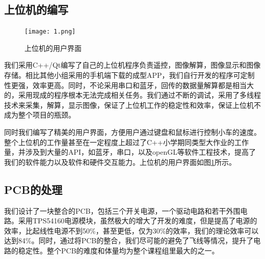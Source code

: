 \documentclass[a4paper]{paper}
\begin{document}
\subsection{上位机的编写}
\begin{figure}
    \centering
    \texttt{[image: 1.png]}
    \caption{上位机的用户界面}
    \label{UI}
\end{figure}
我们采用C++/Qt编写了自己的上位机程序负责遥控，图像解算，图像显示和图像存储。相比其他小组采用的手机端下载的成型APP，我们自行开发的程序可定制性更强，效率更高。同时，不论采用串口和蓝牙，回传的数据量解算都是相当大的，采用现成的程序根本无法完成相关任务。我们通过不断的调试，采用了多线程技术来采集，解算，显示图像，保证了上位机工作的稳定性和效率，保证上位机不成为整个项目的瓶颈。

同时我们编写了精美的用户界面，方便用户通过键盘和鼠标进行控制小车的速度。整个上位机的工作量甚至在一定程度上超过了C++小学期同类型大作业的工作量，并涉及到大量的API，如蓝牙，串口，以及openGL等软件工程技术，提高了我们的软件能力以及软件和硬件交互能力。上位机的用户界面如图\ref{UI}所示。
\subsection{PCB的处理}
我们设计了一块整合的PCB，包括三个开关电源，一个驱动电路和若干外围电路。采用TPS54160电源模块，虽然极大的增大了开发的难度，但是提高了电源的效率，比起线性电源不到50\%，甚至更低，仅为30\%的效率，我们的理论效率可以达到84\%。同时，通过将PCB的整合，我们尽可能的避免了飞线等情况，提升了电路的稳定性。整个PCB的难度和体量均为整个课程组里最大的之一。
\end{document}
